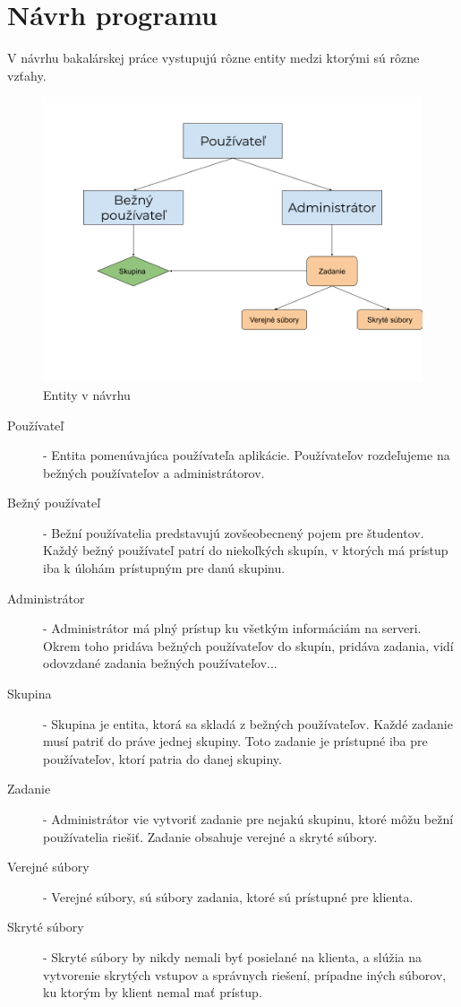 \chapter{Návrh programu}

\label{kap:design} %

V návrhu bakalárskej práce vystupujú rôzne entity medzi ktorými sú rôzne vzťahy. 
\begin{figure}[H]
\centerline{\includegraphics[width=1\textwidth]{images/entity}}
\caption[Entity v návrhu]{Entity v návrhu}
\label{obr:entity}
\end{figure}

\begin{description}
\item [Používateľ] - Entita pomenúvajúca používateľa aplikácie. Používateľov rozdeľujeme na 
bežných používateľov a administrátorov.
\item [Bežný používateľ] - Bežní používatelia predstavujú zovšeobecnený pojem pre študentov. Každý
bežný používateľ patrí do niekoľkých skupín, v ktorých má prístup iba k úlohám prístupným pre danú
skupinu.
\item [Administrátor] - Administrátor má plný prístup ku všetkým informáciám na serveri. Okrem
toho pridáva bežných používateľov do skupín, pridáva zadania, vidí odovzdané zadania bežných
používateľov...
\item [Skupina] - Skupina je entita, ktorá sa skladá z bežných používateľov. Každé zadanie musí
patriť do práve jednej skupiny. Toto zadanie je prístupné iba pre používateľov, ktorí patria do
danej skupiny. 
\item [Zadanie] - Administrátor vie vytvoriť zadanie pre nejakú skupinu, ktoré môžu bežní
používatelia riešiť. Zadanie obsahuje verejné a skryté súbory.
\item [Verejné súbory] - Verejné súbory, sú súbory zadania, ktoré sú prístupné pre klienta.
\item [Skryté súbory] - Skryté súbory by nikdy nemali byť posielané na klienta, a slúžia na 
vytvorenie skrytých vstupov a správnych riešení, prípadne iných súborov, ku ktorým by klient
nemal mať prístup.
\end{description}

